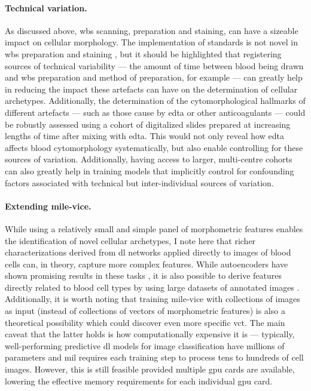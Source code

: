 \paragraph{Technical variation.} As discussed above, \ac{wbs} scanning, preparation and staining, can have a sizeable impact on cellular morphology. The implementation of standards is not novel in \ac{wbs} preparation and staining \cite{Vives_Corrons2004-ha}, but it should be highlighted that registering sources of technical variability --- the amount of time between blood being drawn and \ac{wbs} preparation and method of preparation, for example --- can greatly help in reducing the impact these artefacts can have on the determination of cellular archetypes. Additionally, the determination of the cytomorphological hallmarks of different artefacts --- such as those cause by \ac{edta} or other anticoagulants --- could be robustly assessed using a cohort of digitalized slides prepared at increasing lengths of time after mixing with \ac{edta}. This would not only reveal how \ac{edta} affects blood cytomorphology systematically, but also enable controlling for these sources of variation. Additionally, having access to larger, multi-centre cohorts can also greatly help in training models that implicitly control for confounding factors associated with technical but inter-individual sources of variation.

\paragraph{Extending \ac{mile-vice}.} While using a relatively small and simple panel of morphometric features enables the identification of novel cellular archetypes, I note here that richer characterizations derived from \ac{dl} networks applied directly to images of blood cells can, in theory, capture more complex features. While autoencoders have shown promising results in these tasks \cite{Sommer2017-uj,Wei2021-gw}, it is also possible to derive features directly related to blood cell types by using large datasets of annotated images \cite{Matek2021-mp}. Additionally, it is worth noting that training \ac{mile-vice} with collections of images as input (instead of collections of vectors of morphometric features) is also a theoretical possibility which could discover even more specific \ac{vct}. The main caveat that the latter holds is how computationally expensive it is --- typically, well-performing predictive \ac{dl} models for image classification have millions of parameters and \ac{mil} requires each training step to process tens to hundreds of cell images. However, this is still feasible provided multiple \ac{gpu} cards are available, lowering the effective memory requirements for each individual \ac{gpu} card.

